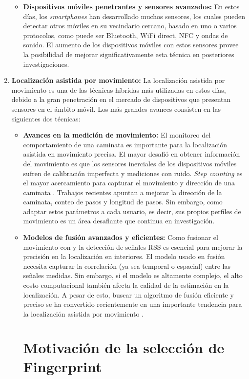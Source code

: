 \begin{enumerate}
\begin{itemize}
\item \textbf{Dispositivos móviles penetrantes y sensores avanzados:} En estos días, los \textit{smartphones} han desarrollado muchos sensores, los cuales pueden detectar otros móviles en su vecindario cercano, basado en uno o varios protocolos, como puede ser Bluetooth, WiFi direct, NFC y ondas de sonido. El aumento de los dispositivos móviles con estos sensores provee la posibilidad de mejorar significativamente esta técnica en posteriores investigaciones.
\end{itemize}


\item \textbf{Localización asistida por movimiento: } La localización asistida por movimiento es una de las técnicas híbridas más utilizadas en estos días, debido a la gran penetración en el mercado de dispositivos que presentan sensores en el ámbito móvil. Los más grandes avances consisten en las siguientes dos técnicas:

\begin{itemize}
\item \textbf{Avances en la medición de movimiento:} El monitoreo del comportamiento de una caminata es importante para la localización asistida en movimiento precisa. El mayor desafió en obtener información del movimiento es que los sensores inerciales de los dispositivos móviles sufren de calibración imperfecta y mediciones con ruido. \textit{Step counting} es el mayor acercamiento para capturar el movimiento y dirección de una caminata \citep{6407455}. Trabajos recientes apuntan a mejorar la dirección de la caminata, conteo de pasos y longitud de pasos. Sin embargo, como adaptar estos parámetros a cada usuario, es decir, sus propios perfiles de movimiento es un área desafiante que continua en investigación.

\item \textbf{Modelos de fusión avanzados y eficientes:} Como fusionar el movimiento con y la detección de señales RSS es esencial para mejorar la precisión en la localización en interiores. El modelo usado en fusión necesita capturar la correlación (ya sea temporal o espacial) entre las señales medidas. Sin embargo, si el modelo es altamente complejo, el alto costo computacional también afecta la calidad de la estimación en la localización. A pesar de esto, buscar un algoritmo de fusión eficiente y preciso se ha convertido recientemente en una importante tendencia para la localización asistida por movimiento \citep{6846747}.

\section{Motivación de la selección de Fingerprint}


\end{itemize}
\end{enumerate}
